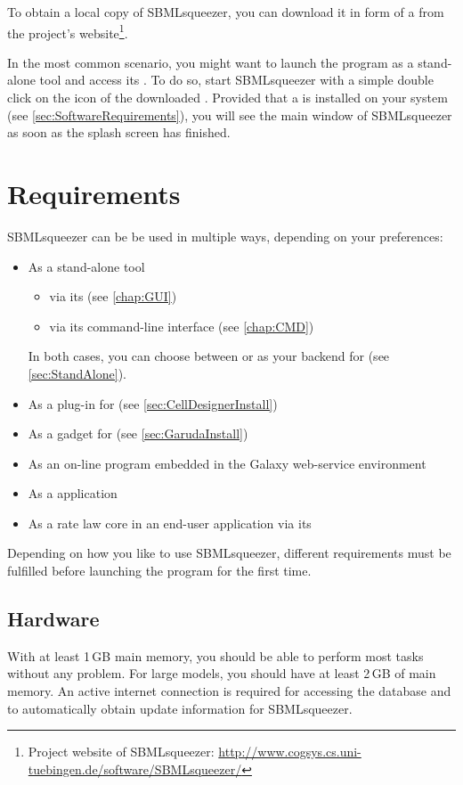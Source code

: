 To obtain a local copy of SBMLsqueezer, you can download it in form of a 
\JAR from the project's website\footnote{Project website of SBMLsqueezer: \url{http://www.cogsys.cs.uni-tuebingen.de/software/SBMLsqueezer/}}.

In the most common scenario, you might want to launch the program as a
stand-alone tool and access its \GUI. To do so,
start SBMLsqueezer with a simple double click on the icon of the downloaded
\JAR.
Provided that a \JVM is installed on your system 
(see \vref{sec:SoftwareRequirements}), you will see the main window of
SBMLsqueezer as soon as the splash screen has finished.

\section{Requirements}

SBMLsqueezer can be be used in multiple ways, depending on your preferences:
\begin{itemize}
  \item As a stand-alone tool
  \begin{itemize}
    \item via its \GUI (see \vref{chap:GUI})
    \item via its command-line interface (see \vref{chap:CMD})
  \end{itemize}
        In both cases, you can choose between \JSBML or \libSBML as your backend
        for \SBML (see \vref{sec:StandAlone}).
  \item As a plug-in for \CellDesigner (see \vref{sec:CellDesignerInstall})
  \item As a gadget for \Garuda (see \vref{sec:GarudaInstall})
  \item As an on-line program embedded in the Galaxy web-service environment \citet{Goecks2010}
  \item As a \JavaWebStart application
  \item As a rate law core in an end-user application via its \API
\end{itemize}
Depending on how you like to use SBMLsqueezer, different requirements must be
fulfilled before launching the program for the first time.

\subsection{Hardware}

With at least 1\,GB main memory, you should be able to perform most tasks
without any problem. For large models, you should have at least 2\,GB of main
memory. An active internet connection is required for accessing the \SABIO
database and to automatically obtain update information for SBMLsqueezer.


